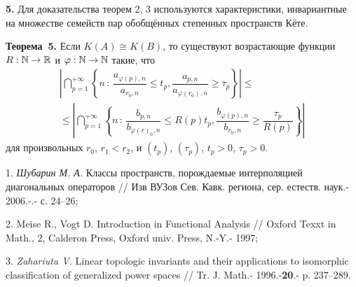 {\bf 5. } Для доказательства теорем 2, 3 используются
характеристики, инвариантные на множестве семейств пар обобщённых степенных пространств Кёте.

\noindent\textbf{Теорема~5.}
Если $K(A)\cong K(B)$, то существуют возрастающие функции $R:{\Bbb N}\to {\Bbb R}$ и $\varphi : {\Bbb N}\to {\Bbb N}$
такие, что
\begin{eqnarray*}
\left|\bigcap\limits_{p=1}^{+\infty }
\left\{
n\,:\,\dfrac{a_{\varphi(p),n}}{a_{r_0,n}}\leqslant t_p,
\dfrac{a_{p,n}}{a_{\varphi(r_0),n}}\geqslant \tau_p
\right\}\right|
\leqslant \\ \leqslant\left|\bigcap\limits_{p=1}^{+\infty }
\left\{
n\,:\,\dfrac{b_{p,n}}{b_{\varphi(r)_0,n}}\leqslant R(p)t_p,
\dfrac{b_{\varphi(p),n}}{b_{r_0,n}}\geqslant \dfrac{\tau_p}{R(p)}
\right\}\right|
\end{eqnarray*}
для произвольных $r_0$, $r_1<r_2$, и $(t_p)$, $(\tau _p)$, $t_p>0$, $\tau _p>0$.

\litlist

1. {\it Шубарин М. А.} Классы пространств, порождаемые интерполяцией
диагональных операторов // Изв ВУЗов Сев. Кавк. региона, сер. естеств. наук.- 2006.-.- с. 24--26;

2. {Meise R., Vogt D.} Introduction in Functional Analysis // Oxford Texxt in Math., 2,
Calderon Press, Oxford univ. Press, N.-Y.- 1997;

3. {\it Zahariuta V.} Linear topologic invariants and their appli\-cations
to isomorphic classification of generalized power spaces // Tr. J. Math.- 1996.-{\bf 20}.- p. 237--289.
